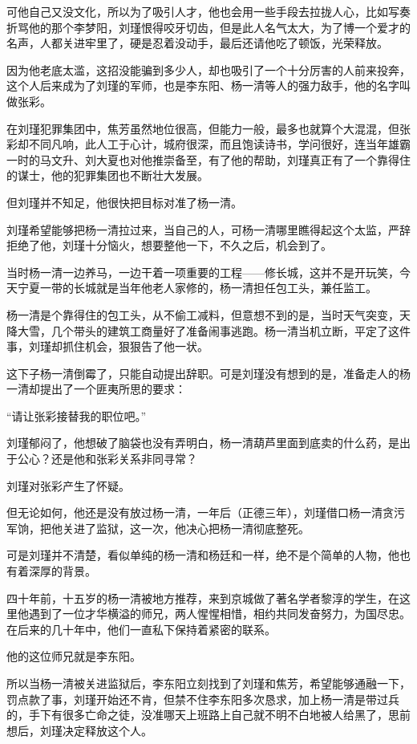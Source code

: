 \begin{multicols}{\theparacolNo}
可他自己又没文化，所以为了吸引人才，他也会用一些手段去拉拢人心，比如写奏折骂他的那个李梦阳，刘瑾恨得咬牙切齿，但是此人名气太大，为了博一个爱才的名声，人都关进牢里了，硬是忍着没动手，最后还请他吃了顿饭，光荣释放。

因为他老底太滥，这招没能骗到多少人，却也吸引了一个十分厉害的人前来投奔，这个人后来成为了刘瑾的军师，也是李东阳、杨一清等人的强力敌手，他的名字叫做张彩。

在刘瑾犯罪集团中，焦芳虽然地位很高，但能力一般，最多也就算个大混混，但张彩却不同凡响，此人工于心计，城府很深，而且饱读诗书，学问很好，连当年雄霸一时的马文升、刘大夏也对他推崇备至，有了他的帮助，刘瑾真正有了一个靠得住的谋士，他的犯罪集团也不断壮大发展。

但刘瑾并不知足，他很快把目标对准了杨一清。

刘瑾希望能够把杨一清拉过来，当自己的人，可杨一清哪里瞧得起这个太监，严辞拒绝了他，刘瑾十分恼火，想要整他一下，不久之后，机会到了。

当时杨一清一边养马，一边干着一项重要的工程——修长城，这并不是开玩笑，今天宁夏一带的长城就是当年他老人家修的，杨一清担任包工头，兼任监工。

杨一清是个靠得住的包工头，从不偷工减料，但意想不到的是，当时天气突变，天降大雪，几个带头的建筑工商量好了准备闹事逃跑。杨一清当机立断，平定了这件事，刘瑾却抓住机会，狠狠告了他一状。

这下子杨一清倒霉了，只能自动提出辞职。可是刘瑾没有想到的是，准备走人的杨一清却提出了一个匪夷所思的要求：

“请让张彩接替我的职位吧。”

刘瑾郁闷了，他想破了脑袋也没有弄明白，杨一清葫芦里面到底卖的什么药，是出于公心？还是他和张彩关系非同寻常？

刘瑾对张彩产生了怀疑。

但无论如何，他还是没有放过杨一清，一年后（正德三年），刘瑾借口杨一清贪污军饷，把他关进了监狱，这一次，他决心把杨一清彻底整死。

可是刘瑾并不清楚，看似单纯的杨一清和杨廷和一样，绝不是个简单的人物，他也有着深厚的背景。

四十年前，十五岁的杨一清被地方推荐，来到京城做了著名学者黎淳的学生，在这里他遇到了一位才华横溢的师兄，两人惺惺相惜，相约共同发奋努力，为国尽忠。在后来的几十年中，他们一直私下保持着紧密的联系。

他的这位师兄就是李东阳。

所以当杨一清被关进监狱后，李东阳立刻找到了刘瑾和焦芳，希望能够通融一下，罚点款了事，刘瑾开始还不肯，但禁不住李东阳多次恳求，加上杨一清是带过兵的，手下有很多亡命之徒，没准哪天上班路上自己就不明不白地被人给黑了，思前想后，刘瑾决定释放这个人。


\end{multicols}
